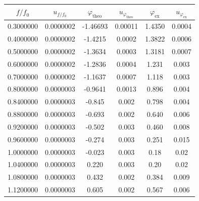 \documentclass[a4paper]{article}
\begin{document}
\begin{table}[!htbp]
	\centering
	\begin{tabular}{cccccc}
		\hline
		$f/f_0$   & $u_{f/f_0}$ & $\varphi_{\text{theo}}$ & $u_{\varphi_\text{theo}}$ & $\varphi_\text{ex}$ & $u_{\varphi_\text{ex}}$ \\
		\hline
		0.3000000 & 0.0000002   & -1.46693                & 0.00011                   & 1.4350              & 0.0004                  \\
		0.4000000 & 0.0000002   & -1.4215                 & 0.0002                    & 1.3822              & 0.0006                  \\
		0.5000000 & 0.0000002   & -1.3634                 & 0.0003                    & 1.3181              & 0.0007                  \\
		0.6000000 & 0.0000002   & -1.2836                 & 0.0004                    & 1.231               & 0.003                   \\
		0.7000000 & 0.0000002   & -1.1637                 & 0.0007                    & 1.118               & 0.003                   \\
		0.8000000 & 0.0000003   & -0.9641                 & 0.0013                    & 0.896               & 0.004                   \\
		0.8400000 & 0.0000003   & -0.845                  & 0.002                     & 0.798               & 0.004                   \\
		0.8800000 & 0.0000003   & -0.693                  & 0.002                     & 0.640               & 0.006                   \\
		0.9200000 & 0.0000003   & -0.502                  & 0.003                     & 0.460               & 0.008                   \\
		0.9600000 & 0.0000003   & -0.274                  & 0.003                     & 0.251               & 0.015                   \\
		1.0000000 & 0.0000003   & -0.023                  & 0.003                     & 0.18                & 0.02                       \\
		1.0400000 & 0.0000003   & 0.220                   & 0.003                     & 0.20                & 0.02                    \\
		1.0800000 & 0.0000003   & 0.432                   & 0.002                     & 0.384               & 0.009                   \\
		1.1200000 & 0.0000003   & 0.605                   & 0.002                     & 0.567               & 0.006                   \\

\end{tabular}
\end{table}
\end{document}
